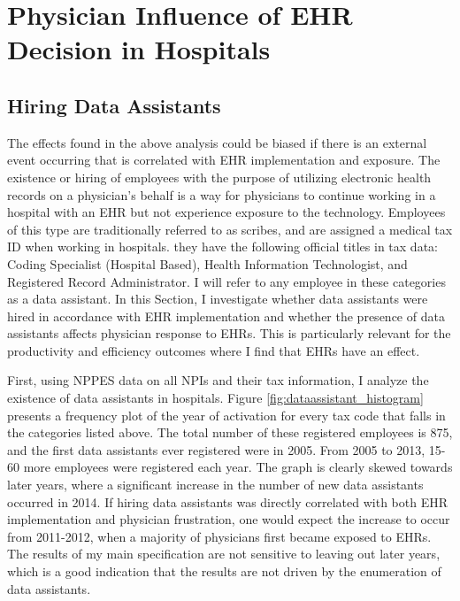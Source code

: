 \documentclass[12pt]{article}
\begin{document}
\section{Physician Influence of EHR Decision in Hospitals}

\subsection{Hiring Data Assistants}\label{sec:dataass}

The effects found in the above analysis could be biased if there is an external event occurring that is correlated with EHR implementation and exposure. The existence or hiring of employees with the purpose of utilizing electronic health records on a physician's behalf is a way for physicians to continue working in a hospital with an EHR but not experience exposure to the technology. Employees of this type are traditionally referred to as scribes, and are assigned a medical tax ID when working in hospitals. they have the following official titles in tax data: Coding Specialist (Hospital Based), Health Information Technologist, and Registered Record Administrator. I will refer to any employee in these categories as a data assistant. In this Section, I investigate whether data assistants were hired in accordance with EHR implementation and whether the presence of data assistants affects physician response to EHRs. This is particularly relevant for the productivity and efficiency outcomes where I find that EHRs have an effect.  

First, using NPPES data on all NPIs and their tax information, I analyze the existence of data assistants in hospitals. Figure \ref{fig:dataassistant_histogram} presents a frequency plot of the year of activation for every tax code that falls in the categories listed above. The total number of these registered employees is 875, and the first data assistants ever registered were in 2005. From 2005 to 2013, 15-60 more employees were registered each year. The graph is clearly skewed towards later years, where a significant increase in the number of new data assistants occurred in 2014. If hiring data assistants was directly correlated with both EHR implementation and physician frustration, one would expect the increase to occur from 2011-2012, when a majority of physicians first became exposed to EHRs. The results of my main specification are not sensitive to leaving out later years, which is a good indication that the results are not driven by the enumeration of data assistants. 
\end{document}
